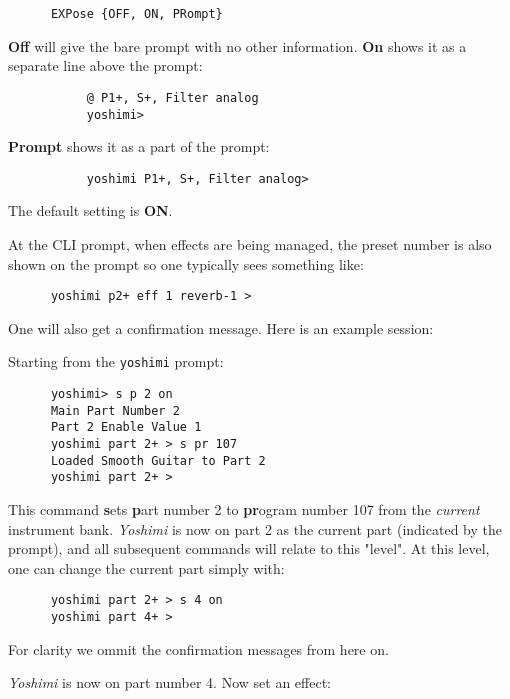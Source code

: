    \begin{verbatim}
      EXPose {OFF, ON, PRompt}
   \end{verbatim}

   \textbf{Off} will give the bare prompt with no other information.
   \textbf{On} shows it as a separate line above the prompt:

   \begin{verbatim}
           @ P1+, S+, Filter analog
           yoshimi>
   \end{verbatim}

   \textbf{Prompt} shows it as a part of the prompt:

   \begin{verbatim}
           yoshimi P1+, S+, Filter analog>
   \end{verbatim}

   The default setting is \textbf{ON}.

   At the CLI prompt, when effects are being managed, the preset number is also
   shown on the prompt so one typically sees something like:

   \begin{verbatim}
      yoshimi p2+ eff 1 reverb-1 >
   \end{verbatim}

   One will also get a confirmation message.
   Here is an example session:

   Starting from the \texttt{yoshimi} prompt:

   \begin{verbatim}
      yoshimi> s p 2 on
      Main Part Number 2
      Part 2 Enable Value 1
      yoshimi part 2+ > s pr 107
      Loaded Smooth Guitar to Part 2
      yoshimi part 2+ >
   \end{verbatim}

   This command \textbf{s}ets \textbf{p}art number 2 to \textbf{pr}ogram
   number 107 from the \textsl{current} instrument bank.
   \textsl{Yoshimi} is now on part 2 as the current part (indicated by the
   prompt), and all subsequent commands will relate to this "level".
   At this level, one can change the current part simply with:

   \begin{verbatim}
      yoshimi part 2+ > s 4 on
      yoshimi part 4+ >
   \end{verbatim}

   For clarity we ommit the confirmation messages from here on.

   \textsl{Yoshimi} is now on part number 4. Now set an effect:

